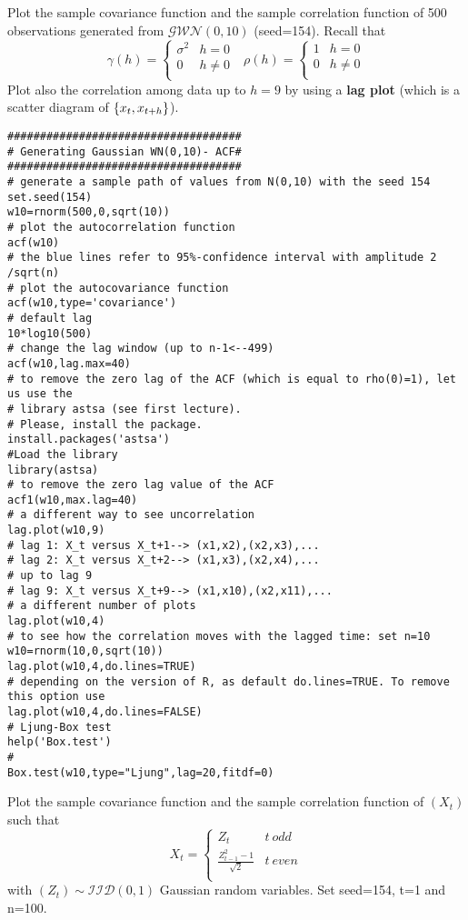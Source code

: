 \begin{example}
    Plot the sample covariance function and the sample correlation function of 500 observations generated from $\mathcal{GWN}(0,10)$ (seed=154). Recall that
    \[
        \gamma(h)=\begin{cases}
            \sigma^2&h=0\\
            0&h\ne0\\
        \end{cases}
        \ \ \ 
        \rho(h)=\begin{cases}
            1&h=0\\
            0&h\ne0\\
        \end{cases}  
    \]
    Plot also the correlation among data up to $h=9$ by using a \textbf{lag plot} (which is a scatter diagram of $\left\{x_t,x_{t+h}\right\}$).

\begin{verbatim}
####################################
# Generating Gaussian WN(0,10)- ACF#
####################################
# generate a sample path of values from N(0,10) with the seed 154
set.seed(154)
w10=rnorm(500,0,sqrt(10))
# plot the autocorrelation function
acf(w10)
# the blue lines refer to 95%-confidence interval with amplitude 2 /sqrt(n)
# plot the autocovariance function
acf(w10,type='covariance')
# default lag
10*log10(500)
# change the lag window (up to n-1<--499)
acf(w10,lag.max=40)
# to remove the zero lag of the ACF (which is equal to rho(0)=1), let us use the
# library astsa (see first lecture).
# Please, install the package.
install.packages('astsa')
#Load the library
library(astsa)
# to remove the zero lag value of the ACF
acf1(w10,max.lag=40)
# a different way to see uncorrelation
lag.plot(w10,9)
# lag 1: X_t versus X_t+1--> (x1,x2),(x2,x3),...
# lag 2: X_t versus X_t+2--> (x1,x3),(x2,x4),...
# up to lag 9
# lag 9: X_t versus X_t+9--> (x1,x10),(x2,x11),...
# a different number of plots
lag.plot(w10,4)
# to see how the correlation moves with the lagged time: set n=10
w10=rnorm(10,0,sqrt(10))
lag.plot(w10,4,do.lines=TRUE)
# depending on the version of R, as default do.lines=TRUE. To remove this option use
lag.plot(w10,4,do.lines=FALSE)
# Ljung-Box test
help('Box.test')
#
Box.test(w10,type="Ljung",lag=20,fitdf=0)
\end{verbatim}
\end{example}

\begin{exercise}
    Plot the sample covariance function and the sample correlation function of $(X_t)$ such that
    \[
        X_t=\begin{cases}
            Z_t&t\ odd\\
            \frac{Z_{t-1}^2-1}{\sqrt{2}}&t\ even\\
        \end{cases}  
    \]
    with $(Z_t)\sim\mathcal{IID}(0,1)$ Gaussian random variables. Set seed=154, t=1 and n=100.
\end{exercise}

